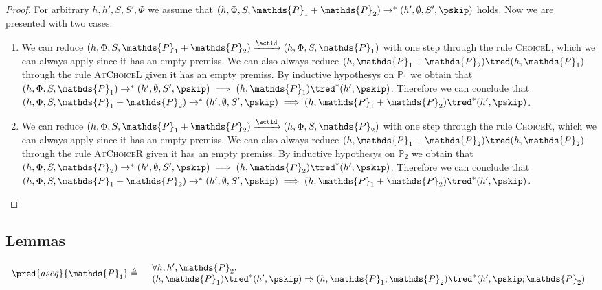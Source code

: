 {\begin{proof}
For arbitrary $h, h', S, S', \Phi$ we assume that $(h, \Phi, S, \mathds{P}_1 + \mathds{P}_2) \rightarrow^* (h', \emptyset, S', \pskip)$ holds. Now we are presented with two cases:
\begin{enumerate}
\item We can reduce $(h, \Phi, S, \mathds{P}_1 + \mathds{P}_2) \xrightarrow{\actid} (h, \Phi, S, \mathds{P}_1)$ with one step through the rule \textsc{ChoiceL}, which we can always apply since it has an empty premiss. We can also always reduce $(h, \mathds{P}_1 + \mathds{P}_2) \tred (h, \mathds{P}_1)$ through the rule \textsc{AtChoiceL} given it has an empty premiss. By inductive hypothesys on $\mathds{P}_1$ we obtain that $(h, \Phi, S, \mathds{P}_1) \rightarrow^* (h', \emptyset, S', \pskip) \implies (h, \mathds{P}_1) \tred^* (h', \pskip)$. Therefore we can conclude that $(h, \Phi, S, \mathds{P}_1 + \mathds{P}_2) \rightarrow^* (h', \emptyset, S', \pskip) \implies  (h, \mathds{P}_1 + \mathds{P}_2) \tred^* (h', \pskip)$.
\item We can reduce $(h, \Phi, S, \mathds{P}_1 + \mathds{P}_2) \xrightarrow{\actid} (h, \Phi, S, \mathds{P}_2)$ with one step through the rule \textsc{ChoiceR}, which we can always apply since it has an empty premiss. We can also always reduce $(h, \mathds{P}_1 + \mathds{P}_2) \tred (h, \mathds{P}_2)$ through the rule \textsc{AtChoiceR} given it has an empty premiss. By inductive hypothesys on $\mathds{P}_2$ we obtain that $(h, \Phi, S, \mathds{P}_2) \rightarrow^* (h', \emptyset, S', \pskip) \implies (h, \mathds{P}_2) \tred^* (h', \pskip)$. Therefore we can conclude that $(h, \Phi, S, \mathds{P}_1 + \mathds{P}_2) \rightarrow^* (h', \emptyset, S', \pskip) \implies  (h, \mathds{P}_1 + \mathds{P}_2) \tred^* (h', \pskip)$.
\end{enumerate}
\end{proof}
}

\subsection{Lemmas}

\lem \label{ref:aseq}
\[
\begin{array}{r l}
	\pred{aseq}{\mathds{P}_1} \triangleq
	&
	\begin{array}{l}
	\forall h, h', \mathds{P}_2 \ldotp \\
	(h, \mathds{P}_1) \tred^* (h', \pskip) \Rightarrow 
	(h, \mathds{P}_1; \mathds{P}_2) \tred^* (h', \pskip; \mathds{P}_2)
	\end{array}
\end{array}
\]

